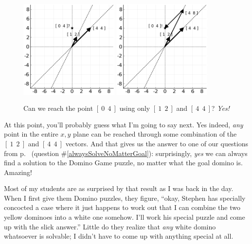 \begin{figure}[hb]
\centering
\includegraphics[width=0.44\textwidth]{yellowVectors0_4.png}
\includegraphics[width=0.44\textwidth]{yellowVectors0_4sol.png}
\caption{Can we reach the point $[\ 0\ \ 4\ ]$ using only $[\ 1\ \ 2\ ]$ and
$[\ 4\ \ 4\ ]$? \textit{Yes!}}
\label{fig:yellowVectors0_4}
\end{figure}

At this point, you'll probably guess what I'm going to say next. Yes indeed,
\textit{any} point in the entire $x,y$ plane can be reached through some
combination of the $[\ 1\ \ 2\ ]$ and $[\ 4\ \ 4\ ]$ vectors. And that gives us
the answer to one of our questions from p.~\pageref{alwaysSolveNoMatterGoal}
(question \#\ref{alwaysSolveNoMatterGoal}): surprisingly, \textit{yes} we can
always find a solution to the Domino Game puzzle, no matter what the goal
domino is. Amazing!

Most of my students are as surprised by that result as I was back in the day.
When I first give them Domino puzzles, they figure, ``okay, Stephen has
specially concocted a case where it just happens to work out that I can combine
the two yellow dominoes into a white one somehow. I'll work his special puzzle
and come up with the slick answer.'' Little do they realize that \textit{any}
white domino whatsoever is solvable; I didn't have to come up with anything
special at all.

